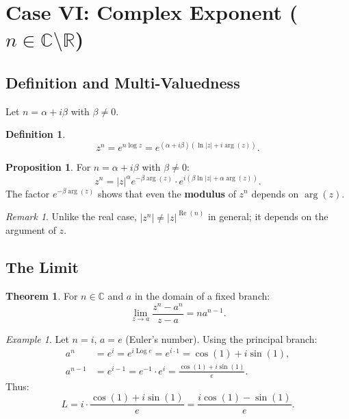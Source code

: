 \documentclass{article}
\theoremstyle{definition}
\newtheorem{definition}{Definition}[section]
\newtheorem{theorem}{Theorem}[section]
\newtheorem{proposition}{Proposition}[section]
\theoremstyle{remark}
\newtheorem{remark}{Remark}[section]
\newtheorem{example}{Example}[section]
\newcommand{\C}{\mathbb{C}}
\newcommand{\R}{\mathbb{R}}
\newcommand{\Log}{\operatorname{Log}}
\newcommand{\re}{\operatorname{Re}}
\begin{document}
\section{Case VI: Complex Exponent ($n \in \C \setminus \R$)}

\subsection{Definition and Multi-Valuedness}

Let $n = \alpha + i\beta$ with $\beta \neq 0$.

\begin{definition}
\begin{equation}
z^n = e^{n \log z} = e^{(\alpha + i\beta)(\ln|z| + i\arg(z))}.
\end{equation}
\end{definition}

\begin{proposition}
For $n = \alpha + i\beta$ with $\beta \neq 0$:
\begin{equation}
z^n = |z|^\alpha e^{-\beta \arg(z)} \cdot e^{i(\beta \ln|z| + \alpha \arg(z))}.
\end{equation}
The factor $e^{-\beta \arg(z)}$ shows that even the \textbf{modulus} of $z^n$ depends on $\arg(z)$.
\end{proposition}

\begin{remark}
Unlike the real case, $|z^n| \neq |z|^{\re(n)}$ in general; it depends on the argument of $z$.
\end{remark}

\subsection{The Limit}

\begin{theorem}
For $n \in \C$ and $a$ in the domain of a fixed branch:
\begin{equation}
\lim_{z \to a} \frac{z^n - a^n}{z - a} = n a^{n-1}.
\end{equation}
\end{theorem}

\begin{example}
Let $n = i$, $a = e$ (Euler's number). Using the principal branch:
\begin{align}
a^n &= e^i = e^{i \Log e} = e^{i \cdot 1} = \cos(1) + i\sin(1), \\
a^{n-1} &= e^{i-1} = e^{-1} \cdot e^i = \frac{\cos(1) + i\sin(1)}{e}.
\end{align}
Thus:
\begin{equation}
L = i \cdot \frac{\cos(1) + i\sin(1)}{e} = \frac{i\cos(1) - \sin(1)}{e}.
\end{equation}
\end{example}
\end{document}
